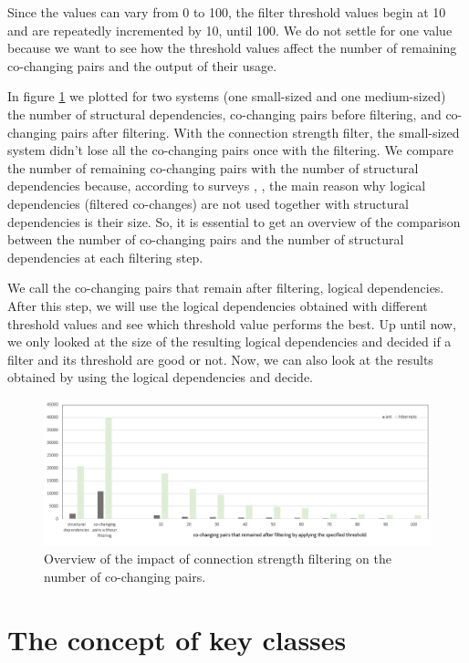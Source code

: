 \documentclass[runningheads]{comsis2}
\begin{document}
Since the values can vary from 0 to 100, the filter threshold values begin at 10 and are repeatedly incremented by 10, until 100. We do not settle for one value because we want to see how the threshold values affect the number of remaining co-changing pairs and the output of their usage.

In figure \ref{fig:strength_overview} we plotted for two systems (one small-sized and one medium-sized) the number of structural dependencies, co-changing pairs before filtering, and co-changing pairs after filtering. With the connection strength filter, the small-sized system didn't lose all the co-changing pairs once with the filtering.
We compare the number of remaining co-changing pairs with the number of structural dependencies because, according to surveys \cite{Shtern:2012:CMS:2332427.2332428}, \cite{sar}, the main reason why logical dependencies (filtered co-changes) are not used together with structural dependencies is their size. So, it is essential to get an overview of the comparison between the number of co-changing pairs and the number of structural dependencies at each filtering step.

We call the co-changing pairs that remain after filtering, logical dependencies. 
After this step, we will use the logical dependencies obtained with different threshold values and see which threshold value performs the best. Up until now, we only looked at the size of the resulting logical dependencies and decided if a filter and its threshold are good or not. Now, we can also look at the results obtained by using the logical dependencies and decide.

\begin{figure}
\centering
\includegraphics[width=\textwidth]{strength_overview.PNG}
\caption{Overview of the impact of connection strength filtering on the number of co-changing pairs. }
\label{fig:strength_overview}
\centering
\end{figure}

\section{The concept of key classes}
\label{sec:baseline_approach}
\end{document}

